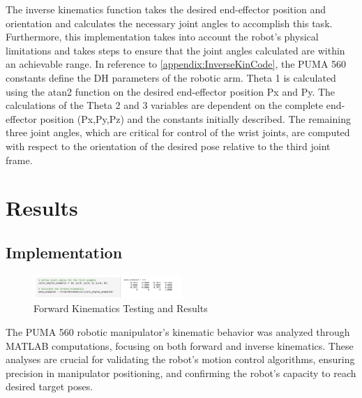 \documentclass[conference]{IEEEtran}
\begin{document}
The inverse kinematics function takes the desired end-effector position and orientation and calculates the necessary joint angles to accomplish this task. Furthermore, this implementation takes into account the robot's physical limitations and takes steps to ensure that the joint angles calculated are within an achievable range. In reference to \ref{appendix:InverseKinCode}, the PUMA 560 constants define the DH parameters of the robotic arm. Theta 1 is calculated using the atan2 function on the desired end-effector position Px and Py. The calculations of the Theta 2 and 3 variables are dependent on the complete end-effector position (Px,Py,Pz) and the constants initially described. The remaining three joint angles, which are critical for control of the wrist joints, are computed with respect to the orientation of the desired pose relative to the third joint frame. 

\section{Results}
\subsection{Implementation}
\begin{figure}[H]
    \centering
    \includegraphics[width=0.5\textwidth]{forwardKinTesting.png}
    \caption{Forward Kinematics Testing and Results}
    \label{fig:ForwardKinTesting}
\end{figure}

The PUMA 560 robotic manipulator's kinematic behavior was analyzed through MATLAB computations, focusing on both forward and inverse kinematics. These analyses are crucial for validating the robot's motion control algorithms, ensuring precision in manipulator positioning, and confirming the robot's capacity to reach desired target poses.
\end{document}
